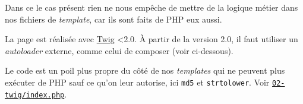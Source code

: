 Dans ce le cas présent rien ne nous empêche de mettre de la logique
métier dans nos fichiers de \emph{template}, car ils sont faits de PHP
eux aussi.

\begin{english}

\begin{Shaded}
\begin{Highlighting}[]

\KeywordTok{\textgreater{}}
\KeywordTok{\textgreater{}}
\end{Highlighting}
\end{Shaded}

\end{english}

La page est réalisée avec \href{http://twig.sensiolabs.org/}{Twig}
\textless2.0. À partir de la version 2.0, il faut utiliser un
\emph{autoloader} externe, comme celui de composer (voir ci-dessous).

Le code est un poil plus propre du côté de nos \emph{templates} qui ne
peuvent plus exécuter de PHP sauf ce qu'on leur autorise, ici
\textenglish{\texttt{md5}} et \textenglish{\texttt{strtolower}}. Voir
\href{02-twig/index.php}{\textenglish{\texttt{02-twig/index.php}}}.

